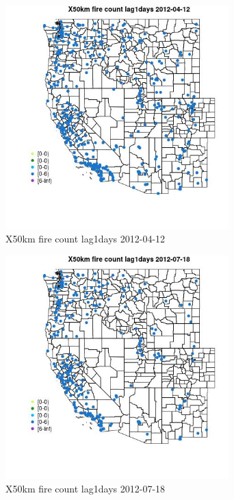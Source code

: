\begin{figure} 
\centering  
\includegraphics[width=0.77\textwidth]{Code_Outputs/Report_ML_input_PM25_Step4_part_e_de_duplicated_aves_compiled_2019-05-14wNAs_MapObsX50km_fire_count_lag1days2012-04-12.jpg} 
\caption{\label{fig:Report_ML_input_PM25_Step4_part_e_de_duplicated_aves_compiled_2019-05-14wNAsMapObsX50km_fire_count_lag1days2012-04-12}X50km fire count lag1days 2012-04-12} 
\end{figure} 
 

\begin{figure} 
\centering  
\includegraphics[width=0.77\textwidth]{Code_Outputs/Report_ML_input_PM25_Step4_part_e_de_duplicated_aves_compiled_2019-05-14wNAs_MapObsX50km_fire_count_lag1days2012-07-18.jpg} 
\caption{\label{fig:Report_ML_input_PM25_Step4_part_e_de_duplicated_aves_compiled_2019-05-14wNAsMapObsX50km_fire_count_lag1days2012-07-18}X50km fire count lag1days 2012-07-18} 
\end{figure} 
 

